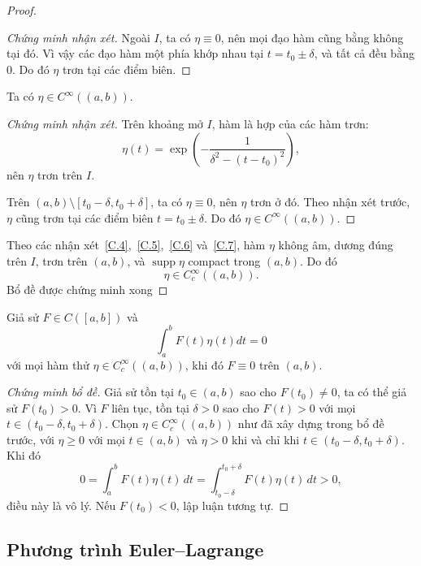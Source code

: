 ﻿\documentclass[12pt]{article}
\begin{document}
\begin{proof}
\begin{proof}[Chứng minh nhận xét]
Ngoài $I$, ta có $\eta\equiv0$, nên mọi đạo hàm cũng bằng không tại đó. Vì vậy các đạo hàm một phía khớp nhau tại $t = t_0 \pm \delta$, và tất cả đều bằng $0$. Do đó $\eta$ trơn tại các điểm biên.
\end{proof}

\begin{claim}\label{C.7}
Ta có $\eta \in C^\infty((a, b))$.
\end{claim}

\begin{proof}[Chứng minh nhận xét]
Trên khoảng mở $I$, hàm là hợp của các hàm trơn:
\[
 \eta(t) = \exp\left(-\frac{1}{\delta^2 - (t - t_0)^2}\right),
\]
nên $\eta$ trơn trên $I$.

Trên $(a, b)\setminus [t_0 - \delta, t_0 + \delta]$, ta có $\eta\equiv0$, nên $\eta$ trơn ở đó. Theo nhận xét trước, $\eta$ cũng trơn tại các điểm biên $t = t_0 \pm \delta$. Do đó
$
 \eta \in C^\infty((a, b)).
$
\end{proof}
    Theo các nhận xét~\ref{C.4},~\ref{C.5},~\ref{C.6} và~\ref{C.7}, hàm $\eta$ không âm, dương đúng trên $I$, trơn trên $(a, b)$, và $\operatorname{supp}\eta$ compact trong $(a, b)$. Do đó
\[
 \eta \in C_c^\infty((a, b)).
\]
Bổ đề được chứng minh xong
\end{proof}
    \begin{lemma}\label{FFL}
        Giả sử $F \in C([a, b])$ và
        \[ \int_a^b F(t)\eta(t)dt = 0
 \]
        với mọi hàm thử $\eta \in C_c^\infty((a, b))$, khi đó $F \equiv 0$ trên $(a, b)$.
    \end{lemma}
    \begin{proof}[Chứng minh bổ đề]
        Giả sử tồn tại $t_0 \in (a, b)$ sao cho $F(t_0) \neq 0$, ta có thể giả sử $F(t_0) > 0$. Vì $F$ liên tục, tồn tại $\delta > 0$ sao cho $F(t) > 0$ với mọi $t \in (t_0 - \delta, t_0 + \delta)$. Chọn $\eta \in C_c^\infty((a, b))$ như đã xây dựng trong bổ đề trước, với $\eta \geq 0$ với mọi $t \in (a, b)$ và $\eta > 0$ khi và chỉ khi $t \in (t_0 - \delta, t_0 + \delta)$. Khi đó
            \[
 0 = \int_a^b F(t)\eta(t)\, dt = \int_{t_0 - \delta}^{t_0 + \delta}F(t)\eta(t)\, dt > 0,
 \]
            điều này là vô lý.
        Nếu $F(t_0) < 0$, lập luận tương tự.
    \end{proof}
\subsection{Phương trình Euler--Lagrange}\label{append1}
\end{document}
